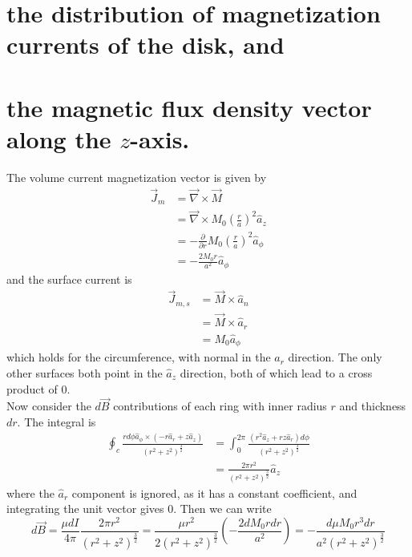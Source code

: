 \documentclass[answers]{exam}
\begin{document}
\begin{questions}
\begin{parts}
    \part{the distribution of magnetization currents of the disk, and}
    \part{the magnetic flux density vector along the $z$-axis.}
\end{parts}

\begin{solution}
    The volume current magnetization vector is given by
    \begin{align*}
        \vec J_m &= \vec\nabla \times \vec M \\
                 &= \vec\nabla \times M_0\left(\frac{r}{a}\right)^2 \hat a_z \\
                 &= -\frac{\partial}{\partial r} M_0\left(\frac{r}{a}\right)^2 \hat a_\phi \\
                 &= -\frac{2M_0r}{a^2} \hat a_\phi
    \end{align*}
    and the surface current is
    \begin{align*}
        \vec J_{m,s} &= \vec M \times \hat a_n \\
                     &= \vec M \times \hat a_r \\
                     &= M_0 \hat a_\phi
    \end{align*}
    which holds for the circumference, with normal in the $\hat a_r$ direction. The only other surfaces both point in the $\hat a_z$ direction, both of which lead to a cross product of 0. \\
    Now consider the $d\vec B$ contributions of each ring with inner radius $r$ and thickness $dr$. The integral is
    \begin{align*}
        \oint_c \frac{rd\phi\hat a_\phi \times (-r\hat a_r + z\hat a_z)}{(r^2+z^2)^{\frac{3}{2}}} &= \int_0^{2\pi} \frac{(r^2\hat a_z + rz\hat a_r)d\phi}{(r^2+z^2)^{\frac{3}{2}}} \\
                                                                                                  &= \frac{2\pi r^2}{(r^2+z^2)^{\frac{3}{2}}}\hat a_z
    \end{align*}
    where the $\hat a_r$ component is ignored, as it has a constant coefficient, and integrating the unit vector gives 0. Then we can write
    $$d\vec B = \frac{\mu dI}{4\pi} \frac{2\pi r^2}{(r^2+z^2)^{\frac{3}{2}}} = \frac{\mu r^2}{2(r^2+z^2)^{\frac{3}{2}}} \left(-\frac{2dM_0 rdr}{a^2}\right) = -\frac{d\mu M_0r^3dr}{a^2(r^2+z^2)^{\frac{3}{2}}}$$

\end{solution}
\end{questions}
\end{document}
